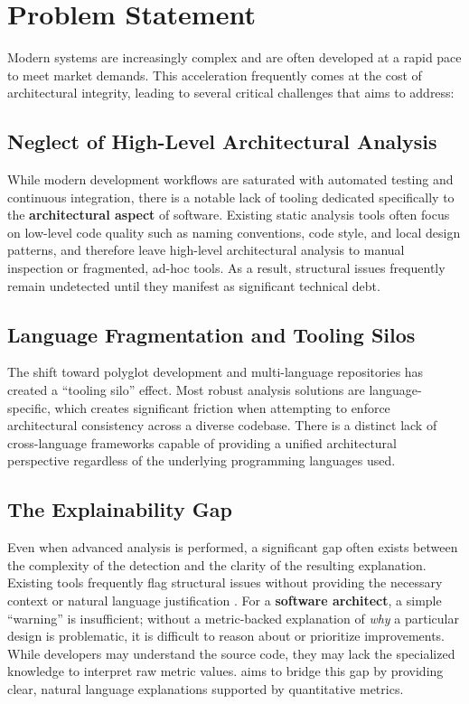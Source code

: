 \section{Problem Statement}
\label{section:problem-statement}

Modern systems are increasingly complex and are often developed at a rapid pace to meet market demands. This acceleration frequently comes at the cost of architectural integrity, leading to several critical challenges that \textbf{\usevar{\srsNickName}} aims to address:



\subsection{Neglect of High-Level Architectural Analysis}
\label{subsection:architectural-neglect}
While modern development workflows are saturated with automated testing and continuous integration, there is a notable lack of tooling dedicated specifically to the \textbf{architectural aspect} of software. Existing static analysis tools often focus on low-level code quality such as naming conventions, code style, and local design patterns, and therefore leave high-level architectural analysis to manual inspection or fragmented, ad-hoc tools. As a result, structural issues frequently remain undetected until they manifest as significant technical debt.

\subsection{Language Fragmentation and Tooling Silos}
\label{subsection:language-fragmentation}
The shift toward polyglot development and multi-language repositories has created a ``tooling silo'' effect. Most robust analysis solutions are language-specific, which creates significant friction when attempting to enforce architectural consistency across a diverse codebase. There is a distinct lack of cross-language frameworks capable of providing a unified architectural perspective regardless of the underlying programming languages used.

\subsection{The Explainability Gap}
\label{subsection:explainability-gap}
Even when advanced analysis is performed, a significant gap often exists between the complexity of the detection and the clarity of the resulting explanation. Existing tools frequently flag structural issues without providing the necessary context or natural language justification \cite{tantithamthavorn2020}. For a \textbf{software architect}, a simple ``warning'' is insufficient; without a metric-backed explanation of \textit{why} a particular design is problematic, it is difficult to reason about or prioritize improvements. While developers may understand the source code, they may lack the specialized knowledge to interpret raw metric values. \textbf{\usevar{\srsNickName}} aims to bridge this gap by providing clear, natural language explanations supported by quantitative metrics.


